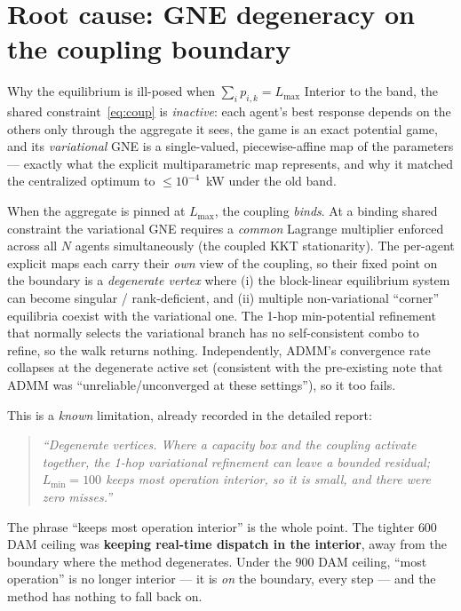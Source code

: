 \documentclass[11pt, letterpaper]{article}
\begin{document}
\section{Root cause: GNE degeneracy on the coupling boundary}
\begin{kbox}{Why the equilibrium is ill-posed when $\sum_i p_{i,k}=L_{\max}$}
Interior to the band, the shared constraint~\eqref{eq:coup} is \emph{inactive}: each agent's best
response depends on the others only through the aggregate it sees, the game is an exact potential
game, and its \emph{variational} GNE is a single-valued, piecewise-affine map of the parameters ---
exactly what the explicit multiparametric map represents, and why it matched the centralized optimum
to $\le\!10^{-4}$~kW under the old band.

When the aggregate is pinned at $L_{\max}$, the coupling \emph{binds}. At a binding shared
constraint the variational GNE requires a \emph{common} Lagrange multiplier enforced across all $N$
agents simultaneously (the coupled KKT stationarity). The per-agent explicit maps each carry their
\emph{own} view of the coupling, so their fixed point on the boundary is a \emph{degenerate vertex}
where (i) the block-linear equilibrium system can become singular / rank-deficient, and (ii) multiple
non-variational ``corner'' equilibria coexist with the variational one. The 1-hop min-potential
refinement that normally selects the variational branch has no self-consistent combo to refine, so
the walk returns nothing. Independently, ADMM's convergence rate collapses at the degenerate active
set (consistent with the pre-existing note that ADMM was ``unreliable/unconverged at these
settings''), so it too fails.
\end{kbox}

This is a \emph{known} limitation, already recorded in the detailed report:
\begin{quote}\itshape
``Degenerate vertices. Where a capacity box and the coupling activate together, the 1-hop
variational refinement can leave a bounded residual; $L_{\min}=100$ keeps most operation interior,
so it is small, and there were zero misses.''
\end{quote}
The phrase ``keeps most operation interior'' is the whole point. The tighter $600$ DAM ceiling was
\textbf{keeping real-time dispatch in the interior}, away from the boundary where the method
degenerates. Under the $900$ DAM ceiling, ``most operation'' is no longer interior --- it is
\emph{on} the boundary, every step --- and the method has nothing to fall back on.
\end{document}
